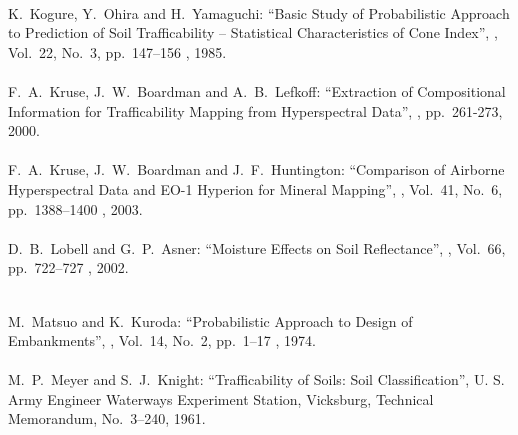 \begin{mythebibliography}{}
\leavevmode \\K.~Kogure, Y.~Ohira and H.~Yamaguchi:
\newblock ``Basic Study of Probabilistic Approach to Prediction of Soil Trafficability -- Statistical Characteristics of Cone Index'',
, Vol.~22, No.~3, pp.~147--156 , 1985.
\\

\leavevmode \\F.~A.~Kruse, J.~W.~Boardman and A.~B.~Lefkoff:
\newblock ``Extraction of Compositional Information for Trafficability Mapping from Hyperspectral Data'',
, pp.~261-273, 2000.
\\

\leavevmode \\F.~A.~Kruse, J.~W.~Boardman and J.~F.~Huntington:
\newblock ``Comparison of Airborne Hyperspectral Data and EO-1 Hyperion for Mineral Mapping'',
, Vol.~41, No.~6, pp.~1388--1400 , 2003.
\\

\leavevmode \\D.~B.~Lobell and G.~P.~Asner:
\newblock ``Moisture Effects on Soil Reflectance'',
, Vol.~66, pp.~722--727 , 2002.
\\ 

\newpage

\leavevmode \\M.~Matsuo and K.~Kuroda:
\newblock ``Probabilistic Approach to Design of Embankments'',
, Vol.~14, No.~2, pp.~1--17 , 1974.
\\ 

\leavevmode \\M.~P.~Meyer and S.~J.~Knight:
\newblock ``Trafficability of Soils: Soil Classification'',
\newblock U. S. Army Engineer Waterways Experiment Station, Vicksburg, Technical Memorandum, No.~3--240, 1961.
\\


\end{mythebibliography}
